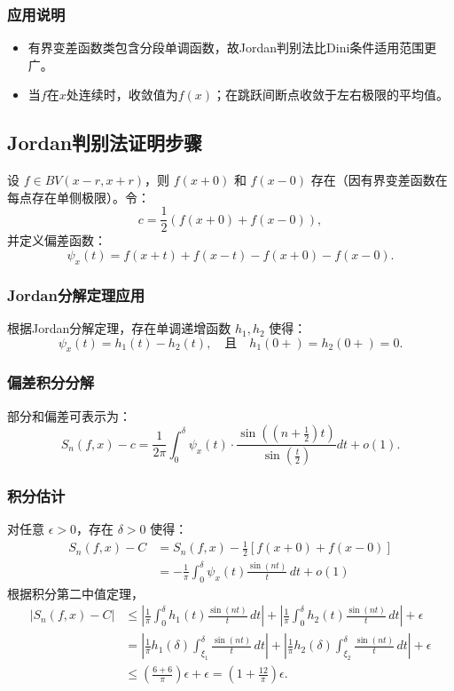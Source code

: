 \documentclass[12pt]{article}
\begin{document}
\subsubsection{应用说明}
\begin{itemize}
	\item 有界变差函数类包含分段单调函数，故Jordan判别法比Dini条件适用范围更广。
	\item 当$f$在$x$处连续时，收敛值为$f(x)$；在跳跃间断点收敛于左右极限的平均值。
\end{itemize}
	
	\subsection{Jordan判别法证明步骤}
	设 \( f \in BV(x-r, x+r) \)，则 \( f(x+0) \) 和 \( f(x-0) \) 存在（因有界变差函数在每点存在单侧极限）。令：
	\[
	c = \frac{1}{2} \left( f(x+0) + f(x-0) \right),
	\]
	并定义偏差函数：
	\[
	\psi_x(t) = f(x+t) + f(x-t) - f(x+0) - f(x-0).
	\]
	
	\subsubsection{Jordan分解定理应用}
	根据Jordan分解定理，存在单调递增函数 \( h_1, h_2 \) 使得：
	\[
	\psi_x(t) = h_1(t) - h_2(t), \quad \text{且} \quad h_1(0+) = h_2(0+) = 0.
	\]
	
	\subsubsection{偏差积分分解}
	部分和偏差可表示为：
	\[
	S_n(f, x) - c = \frac{1}{2\pi} \int_0^\delta \psi_x(t) \cdot \frac{\sin\left( (n+\frac{1}{2})t \right)}{\sin\left( \frac{t}{2} \right)} dt + o(1).
	\]
	
	\subsubsection{积分估计}
	对任意 \( \epsilon > 0 \)，存在 \( \delta > 0 \) 使得：
\[
\begin{aligned}
	S_n(f, x) - C 
	&= S_n(f, x) - \frac{1}{2} \left[ f(x+0) + f(x-0) \right] \\
	&= -\frac{1}{\pi} \int_0^\delta \psi_x(t) \frac{\sin(nt)}{t} \, dt + o(1)
\end{aligned}
\]
根据积分第二中值定理，
\[
\begin{aligned}
	\left| S_n(f, x) - C \right| 
	&\leq \left| \frac{1}{\pi} \int_0^\delta h_1(t) \frac{\sin(nt)}{t} \, dt \right| 
	+ \left| \frac{1}{\pi} \int_0^\delta h_2(t) \frac{\sin(nt)}{t} \, dt \right| 
	+ \epsilon \\
	&= \left| \frac{1}{\pi} h_1(\delta) \int_{\xi_1}^{\delta } \frac{\sin(nt)}{t} \, dt \right| 
	+ \left| \frac{1}{\pi} h_2(\delta) \int_{\xi_2}^{\delta} \frac{\sin(nt)}{t} \, dt \right| 
	+ \epsilon \\
	&\leq \left( \frac{6+6}{\pi} \right) \epsilon + \epsilon 
	= \left( 1 + \frac{12}{\pi} \right)\epsilon.
\end{aligned}
\]
\end{document}
